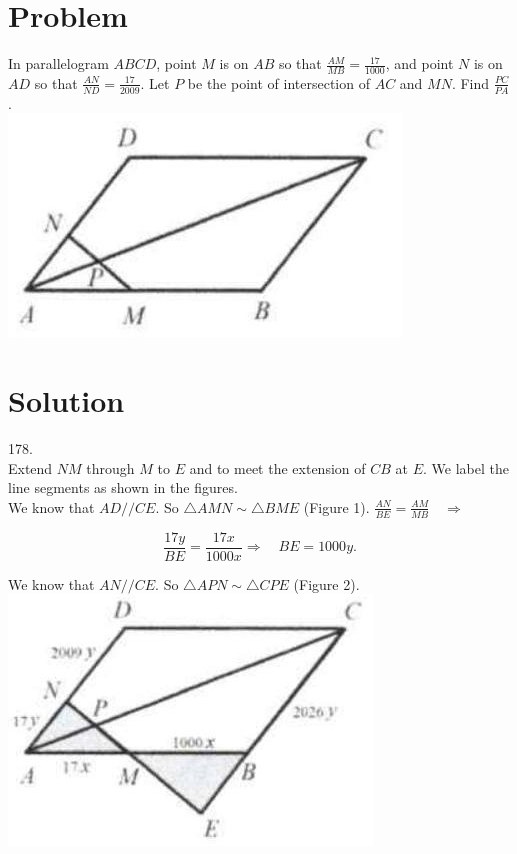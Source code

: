 \documentclass{article}
\begin{document}
\section*{Problem}
In parallelogram \(A B C D\), point \(M\) is on \(A B\) so that \(\frac{A M}{M B}=\frac{17}{1000}\), and point \(N\) is on \(A D\) so that \(\frac{A N}{N D}=\frac{17}{2009}\). Let \(P\) be the point of intersection of \(A C\) and \(M N\). Find \(\frac{P C}{P A}\).\\
\centering
\includegraphics[width=\textwidth]{images/130(1).jpg}

\section*{Solution}
178.\\
Extend \(N M\) through \(M\) to \(E\) and to meet the extension of \(C B\) at \(E\). We label the line segments as shown in the figures.\\
We know that \(A D / / C E\). So \(\triangle A M N \sim \triangle B M E\) (Figure 1). \(\frac{A N}{B E}=\frac{A M}{M B} \quad \Rightarrow\)

\[
\frac{17 y}{B E}=\frac{17 x}{1000 x} \Rightarrow \quad B E=1000 y .
\]

We know that \(A N / / C E\). So \(\triangle A P N \sim \triangle C P E\) (Figure 2).\\
\centering
\includegraphics[width=\textwidth]{images/142(3).jpg}
\end{document}

